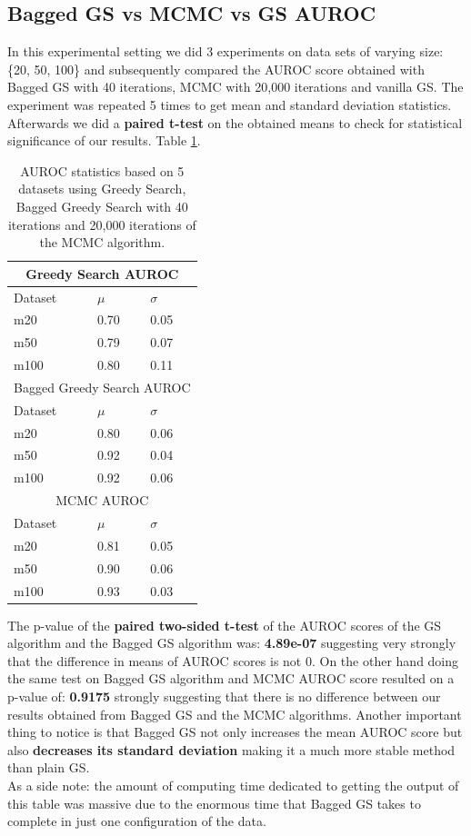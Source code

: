 \documentclass{article}
\begin{document}
	\subsection{Bagged GS vs MCMC vs GS AUROC}
	In this experimental setting we did 3 experiments on data sets of varying
	size: \{20, 50, 100\} and subsequently compared the AUROC score obtained with
	Bagged GS with 40 iterations, MCMC with 20,000 iterations and vanilla GS. The
	experiment was repeated 5 times to get mean and standard deviation
	statistics. Afterwards we did a \textbf{paired t-test} on the obtained means
	to check for statistical significance of our results.
	Table \ref{tabla:iBest}.
	\begin{table}[ht]
		\centering
		\begin{tabular}{ |p{3cm}||p{3cm}|p{3cm}|}
		 \hline
		 \multicolumn{3}{|c|}{Greedy Search AUROC} \\
		 \hline
		 Dataset & $\mu$ & $\sigma$ \\
		 \hline
		 m20 & 0.70 & 0.05 \\
		 m50 & 0.79  & 0.07 \\
		 m100 & 0.80 & 0.11 \\
		 \hline
		 \multicolumn{3}{|c|}{Bagged Greedy Search AUROC} \\
		 \hline
		 Dataset & $\mu$ & $\sigma$ \\
		 \hline
		 m20 & 0.80 & 0.06 \\
		 m50 & 0.92  & 0.04 \\
		 m100 & 0.92 & 0.06 \\
		 \hline
		 \multicolumn{3}{|c|}{MCMC AUROC} \\
		 \hline
		 Dataset & $\mu$ & $\sigma$ \\
		 \hline
		 m20 & 0.81 & 0.05 \\
		 m50 & 0.90  & 0.06 \\
		 m100 & 0.93 & 0.03 \\
		 \hline
		\end{tabular}
		\caption{AUROC statistics based on 5 datasets using Greedy Search, Bagged
			Greedy Search with 40 iterations and 20,000 iterations of the MCMC algorithm.}
		\label{tabla:iBest}
	\end{table}
	The p-value of the \textbf{paired two-sided t-test} of the AUROC scores of the GS algorithm
	and the Bagged GS algorithm was: \textbf{4.89e-07} suggesting very strongly that the
	difference in means of AUROC scores is not 0. On the other hand doing the
	same test on Bagged GS algorithm and MCMC AUROC score resulted on a p-value
	of: \textbf{0.9175} strongly suggesting that there is no difference between our
	results obtained from Bagged GS and the MCMC algorithms. Another important
	thing to notice is that Bagged GS not only increases the mean AUROC score but
	also \textbf{decreases its standard deviation} making it a much more stable method
	than plain GS.
	\\
	As a side note: the amount of computing time dedicated to getting the output
	of this table was massive due to the enormous time that Bagged GS takes to
	complete in just one configuration of the data.
\end{document}
